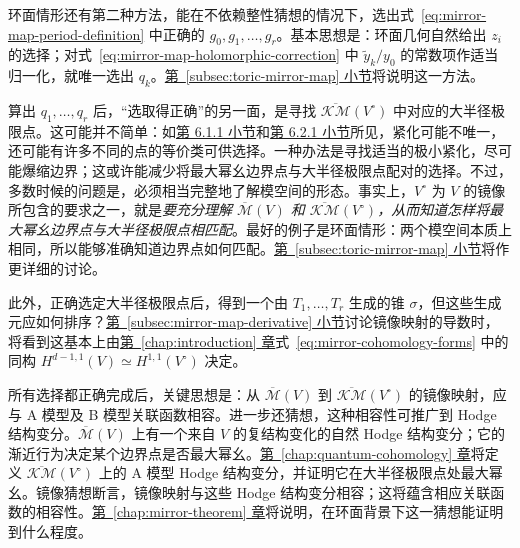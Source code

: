 环面情形还有第二种方法，能在不依赖整性猜想的情况下，选出式~\eqref{eq:mirror-map-period-definition} 中正确的 $g_0,g_1,\ldots,g_r$。基本思想是：环面几何自然给出 $z_i$ 的选择；对式~\eqref{eq:mirror-map-holomorphic-correction} 中 $\widetilde y_k/y_0$ 的常数项作适当归一化，就唯一选出 $q_k$。\hyperref[subsec:toric-mirror-map]{第~\ref*{subsec:toric-mirror-map} 小节}将说明这一方法。

算出 $q_1,\ldots,q_r$ 后，“选取得正确”的另一面，是寻找 $\overline{\mathcal{KM}}(V^\circ)$ 中对应的大半径极限点。这可能并不简单：如\hyperref[subsec:mum-boundary-points]{第 6.1.1 小节}和\hyperref[subsec:large-radius-limits]{第 6.2.1 小节}所见，紧化可能不唯一，还可能有许多不同的点的等价类可供选择。一种办法是寻找适当的极小紧化，尽可能爆缩边界；这或许能减少将最大幂幺边界点与大半径极限点配对的选择。不过，多数时候的问题是，必须相当完整地了解模空间的形态。事实上，$V^\circ$ 为 $V$ 的镜像所包含的要求之一，就是\emph{要充分理解 $\overline{\mathcal M}(V)$ 和 $\overline{\mathcal{KM}}(V^\circ)$，从而知道怎样将最大幂幺边界点与大半径极限点相匹配}。最好的例子是环面情形：两个模空间本质上相同，所以能够准确知道边界点如何匹配。\hyperref[subsec:toric-mirror-map]{第~\ref*{subsec:toric-mirror-map} 小节}将作更详细的讨论。

此外，正确选定大半径极限点后，得到一个由 $T_1,\ldots,T_r$ 生成的锥 $\sigma$，但这些生成元应如何排序？\hyperref[subsec:mirror-map-derivative]{第~\ref*{subsec:mirror-map-derivative} 小节}讨论镜像映射的导数时，将看到这基本上由\hyperref[chap:introduction]{第~\ref*{chap:introduction} 章}式~\eqref{eq:mirror-cohomology-forms} 中的同构 $H^{d-1,1}(V)\simeq H^{1,1}(V^\circ)$ 决定。

所有选择都正确完成后，关键思想是：从 $\overline{\mathcal M}(V)$ 到 $\overline{\mathcal{KM}}(V^\circ)$ 的镜像映射，应与 A 模型及 B 模型关联函数相容。进一步还猜想，这种相容性可推广到 Hodge 结构变分。$\overline{\mathcal M}(V)$ 上有一个来自 $V$ 的复结构变化的自然 Hodge 结构变分；它的渐近行为决定某个边界点是否最大幂幺。\hyperref[chap:quantum-cohomology]{第~\ref*{chap:quantum-cohomology} 章}将定义 $\overline{\mathcal{KM}}(V^\circ)$ 上的 A 模型 Hodge 结构变分，并证明它在大半径极限点处最大幂幺。镜像猜想断言，镜像映射与这些 Hodge 结构变分相容；这将蕴含相应关联函数的相容性。\hyperref[chap:mirror-theorem]{第~\ref*{chap:mirror-theorem} 章}将说明，在环面背景下这一猜想能证明到什么程度。

